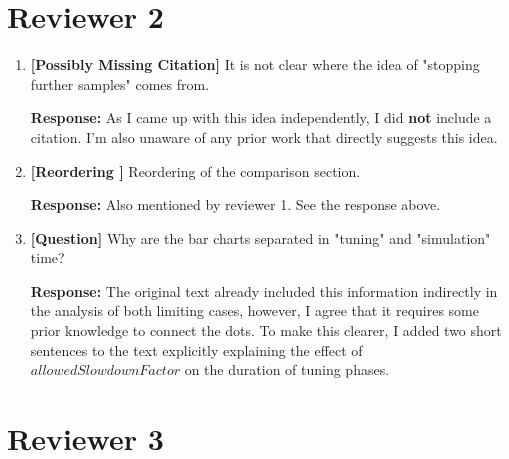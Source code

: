 \documentclass[12pt,a4paper]{article}
\begin{document}
\section*{Reviewer 2}
\begin{enumerate}[label=\textbf{Comment \arabic*:}, itemsep=0.8em]
    \item \textbf{[Possibly Missing Citation]} It is not clear where the idea of "stopping further samples" comes from.

          \textbf{Response:} As I came up with this idea independently, I did \textbf{not} include a citation. I'm also unaware of any prior work that directly suggests this idea.

    \item \textbf{[Reordering ]} Reordering of the comparison section.

          \textbf{Response:} Also mentioned by reviewer 1. See the response above.

    \item \textbf{[Question]} Why are the bar charts separated in "tuning" and "simulation" time?

          \textbf{Response:} The original text already included this information indirectly in the analysis of both limiting cases, however, I agree that it requires some prior knowledge to connect the dots.
          To make this clearer, I added two short sentences to the text explicitly explaining the effect of $allowedSlowdownFactor$ on the duration of tuning phases.

\end{enumerate}

\section*{Reviewer 3}
\end{document}
